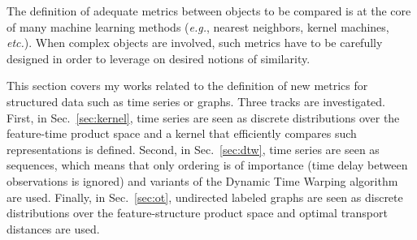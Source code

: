 The definition of adequate metrics between objects to be compared is at the
core of many machine learning methods (\emph{e.g.}, nearest neighbors, kernel
machines, \emph{etc.}).
When complex objects are involved, such metrics have to be carefully designed
in order to leverage on desired notions of similarity.

This section covers my works related to the definition of new metrics for
structured data such as time series or graphs.
Three tracks are investigated.
First, in Sec.~\ref{sec:kernel}, time series are seen as discrete
distributions over the feature-time product space and a kernel that
efficiently compares such representations is defined.
Second, in Sec.~\ref{sec:dtw}, time series are seen as sequences, which
means that only ordering is of importance (time delay between observations
is ignored) and variants of the Dynamic Time Warping algorithm are used.
Finally, in Sec.~\ref{sec:ot}, undirected labeled graphs are seen as
discrete distributions over the feature-structure product space and
optimal transport distances are used.




